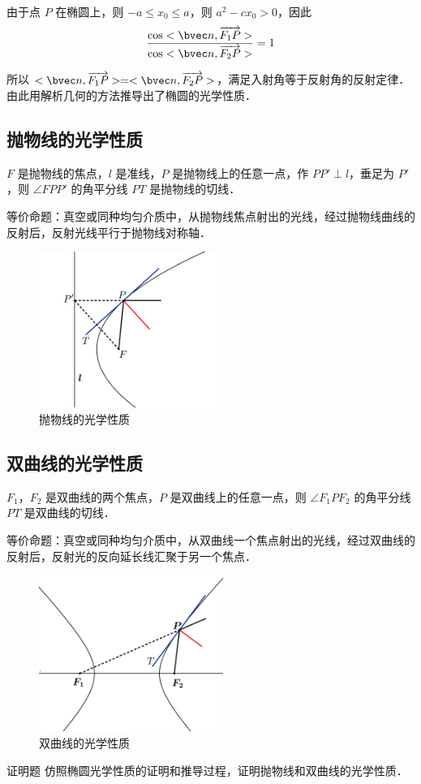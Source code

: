 由于点 $P$ 在椭圆上，则 $-a\leqslant x_0 \leqslant a$，则 $a^2-cx_0 >0$，因此
\begin{equation}
\frac{\cos<\bvec n,\overrightarrow{F_1P}>}{\cos<\bvec n,\overrightarrow{F_2P}>}=1
\end{equation}

所以 $<\bvec n,\overrightarrow{F_1P}>=<\bvec n,\overrightarrow{F_2P}>$，满足入射角等于反射角的反射定律．由此用解析几何的方法推导出了椭圆的光学性质．


\subsection{抛物线的光学性质}
$F$ 是抛物线的焦点，$l$ 是准线，$P$ 是抛物线上的任意一点，作 $PP' \perp l$，垂足为 $P'$，则 $\angle FPP' $ 的角平分线 $ PT $ 是抛物线的切线．

等价命题：真空或同种均匀介质中，从抛物线焦点射出的光线，经过抛物线曲线的反射后，反射光线平行于抛物线对称轴．
\begin{figure}[ht]
\centering
\includegraphics[width=6cm]{./figures/ConOpt4.pdf}
\caption{抛物线的光学性质} \label{ConOpt_fig4}
\end{figure}

\subsection{双曲线的光学性质}
$F_1$，$F_2$ 是双曲线的两个焦点，$P$ 是双曲线上的任意一点，则 $\angle F_1PF_2 $ 的角平分线 $ PT $ 是双曲线的切线．

等价命题：真空或同种均匀介质中，从双曲线一个焦点射出的光线，经过双曲线的反射后，反射光的反向延长线汇聚于另一个焦点．
\begin{figure}[ht]
\centering
\includegraphics[width=6cm]{./figures/ConOpt5.pdf}
\caption{双曲线的光学性质} \label{ConOpt_fig5}
\end{figure}

\begin{exercise}{证明题}\label{ConOpt_exe1}
仿照椭圆光学性质的证明和推导过程，证明抛物线和双曲线的光学性质．
\end{exercise}
